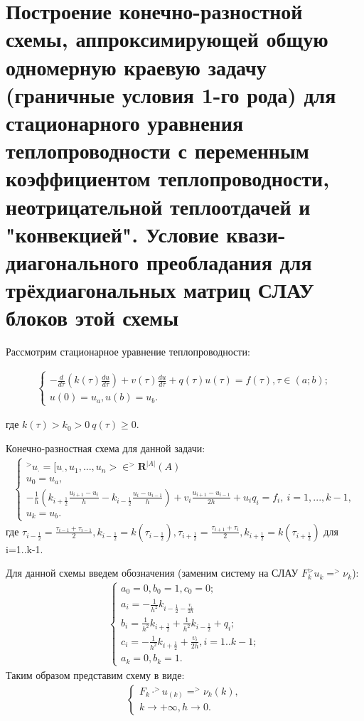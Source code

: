 \documentclass[__main__.tex]{subfiles}
\begin{document}
\section{Построение конечно-разностной схемы, аппроксимирующей общую одномерную краевую задачу (граничные условия 1-го рода) для стационарного уравнения теплопроводности с переменным коэффициентом теплопроводности, неотрицательной теплоотдачей и "конвекцией". Условие квази-диагонального преобладания для трёхдиагональных матриц СЛАУ блоков этой схемы}

Рассмотрим стационарное уравнение теплопроводности:

\begin{gather}
	\begin{cases}
		-\frac{d}{d\tau}(k(\tau)\frac{du}{d\tau})+v(\tau)\frac{du}{d\tau}+q(\tau)u(\tau)=f(\tau), \tau \in (a;b); \\
		u(0)=u_{a}, u(b)=u_{b}.
		\end{cases}
\end{gather}

где $k(\tau)>k_{0}>0 \  q(\tau) \geq 0.$

Конечно-разностная схема для данной задачи:
\begin{gather}
	\begin{cases}
		^>u_{\cdot}=[u_{\cdot}, u_{1},...,u_{n}>\in ^>\mathbf{R}^{|A|}(A)\\
		u_{0}=u_{a},\\
		-\frac{1}{h}(k_{i+\frac{1}{2}}\frac{u_{i+1}-u_{i}}{h}-k_{i-\frac{1}{2}}\frac{u_{i}-u_{i-1}}{h})+v_{i}\frac{u_{i+1}-u_{i-1}}{2h}+u_{i}q_{i}=f_{i}, \ i=1,...,k-1,\\
		u_{k}=u_{b}.
	\end{cases}
\end{gather}
 где $\tau_{i-\frac{1}{2}}=\frac{\tau_{i-1}+\tau_{i-1}}{2}, k_{i-\frac{1}{2}}=k(\tau_{i-\frac{1}{2}}),\tau_{i+\frac{1}{2}}=\frac{\tau_{i+1}+\tau_{i}}{2}, k_{i+\frac{1}{2}}=k(\tau_{i+\frac{1}{2}})$ для i=1..k-1. 
 
 Для данной схемы введем обозначения (заменим систему на СЛАУ $F_{k} ^>u_{k}=^>\nu_{k}$):
 \\
 \begin{gather}
 	\begin{cases}
 		a_{0}=0, b_{0}=1,c_{0}=0;\\
 		a_{i}=-\frac{1}{h^2}k_{i-\frac{1}{2}-\frac{v_{i}}{2h}}\\
 		b_{i}=\frac{1}{h^2}k_{i+\frac{1}{2}}+\frac{1}{h^2}k_{i-\frac{1}{2}}+q_{i};\\
 		c_{i}=-\frac{1}{h^2}k_{i+\frac{1}{2}}+\frac{v_{i}}{2h}, i=1..k-1;\\
 		a_{k}=0, b_{k}=1.
 		\end{cases}
 	\end{gather}
 Таким образом представим схему в виде:\\
 \begin{gather}
 	\begin{cases}
 	F_{k}\cdot ^>u_{(k)}=^>\nu_{k}(k),\\
 	k\to +\infty , h\to0.
 	\end{cases}
 \end{gather}
 
\end{document}

